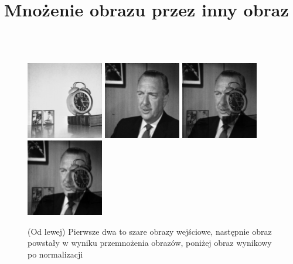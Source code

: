 \documentclass[final,a4paper,openany,12pt]{mwbk}
\begin{document}
\section {Mnożenie obrazu przez inny obraz}
\hfill
\\\\
\indent
\begin{figure}[H]
	\begin{center}
		\includegraphics[width=0.3\textwidth]{1/1Gray_Img1_Multipl_Original}
		\includegraphics[width=0.3\textwidth]{1/1Gray_Img2_Multipl_Original}
		\includegraphics[width=0.3\textwidth]{1/1Gray_Img_Multipl_Result}
		\includegraphics[width=0.3\textwidth]{1/1Gray_Img_Multipl_Result_Norm}
	\end{center}
	\caption{(Od lewej) Pierwsze dwa to szare obrazy wejściowe, następnie obraz powstały w wyniku przemnożenia obrazów, poniżej obraz wynikowy po normalizacji }
\end{figure}
\end{document}
